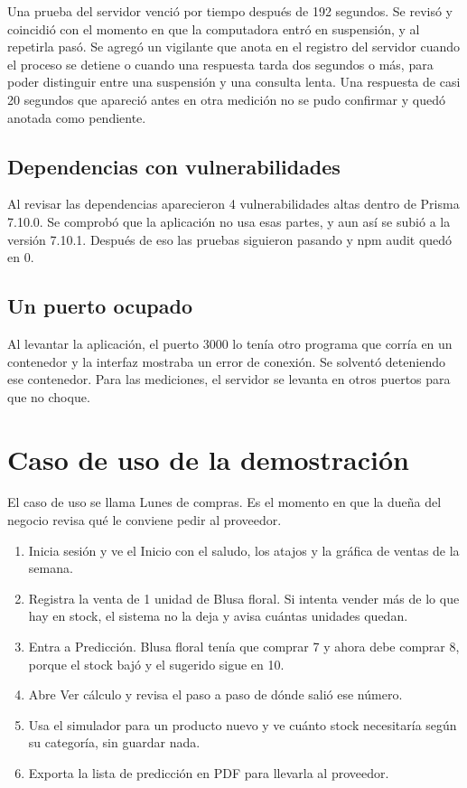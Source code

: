\documentclass[12pt,letterpaper]{article}
\begin{document}
Una prueba del servidor venció por tiempo después de 192 segundos. Se revisó y coincidió con el momento en que la computadora entró en suspensión, y al repetirla pasó. Se agregó un vigilante que anota en el registro del servidor cuando el proceso se detiene o cuando una respuesta tarda dos segundos o más, para poder distinguir entre una suspensión y una consulta lenta. Una respuesta de casi 20 segundos que apareció antes en otra medición no se pudo confirmar y quedó anotada como pendiente.

\subsection{Dependencias con vulnerabilidades}

Al revisar las dependencias aparecieron 4 vulnerabilidades altas dentro de Prisma 7.10.0. Se comprobó que la aplicación no usa esas partes, y aun así se subió a la versión 7.10.1. Después de eso las pruebas siguieron pasando y npm audit quedó en 0.

\subsection{Un puerto ocupado}

Al levantar la aplicación, el puerto 3000 lo tenía otro programa que corría en un contenedor y la interfaz mostraba un error de conexión. Se solventó deteniendo ese contenedor. Para las mediciones, el servidor se levanta en otros puertos para que no choque.

\section{Caso de uso de la demostración}

El caso de uso se llama Lunes de compras. Es el momento en que la dueña del negocio revisa qué le conviene pedir al proveedor.

\begin{enumerate}
\item Inicia sesión y ve el Inicio con el saludo, los atajos y la gráfica de ventas de la semana.
\item Registra la venta de 1 unidad de Blusa floral. Si intenta vender más de lo que hay en stock, el sistema no la deja y avisa cuántas unidades quedan.
\item Entra a Predicción. Blusa floral tenía que comprar 7 y ahora debe comprar 8, porque el stock bajó y el sugerido sigue en 10.
\item Abre Ver cálculo y revisa el paso a paso de dónde salió ese número.
\item Usa el simulador para un producto nuevo y ve cuánto stock necesitaría según su categoría, sin guardar nada.
\item Exporta la lista de predicción en PDF para llevarla al proveedor.
\end{enumerate}
\end{document}
